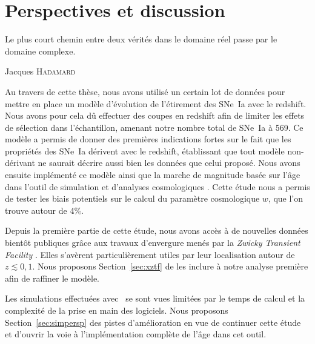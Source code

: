 \documentclass[../main/main.tex]{subfiles}
\begin{document}

\chapter{Perspectives et discussion}\label{ch:persp}
\epigraph{\openquote Le plus court chemin entre deux vérités dans le domaine
    réel passe par le domaine complexe.\closequote}{Jacques \textsc{Hadamard}}

Au travers de cette thèse, nous avons utilisé un certain lot de données pour
mettre en place un modèle d'évolution de l'étirement des SNe~Ia avec le
redshift. Nous avons pour cela dû effectuer des coupes en redshift afin de
limiter les effets de sélection dans l'échantillon, amenant notre nombre total
de SNe~Ia à 569. Ce modèle a permis de donner des premières indications fortes
sur le fait que les propriétés des SNe~Ia dérivent avec le redshift, établissant
que tout modèle non-dérivant ne saurait décrire aussi bien les données que celui
proposé. Nous avons ensuite implémenté ce modèle ainsi que la marche de
magnitude basée sur l'âge dans l'outil de simulation et d'analyses cosmologiques
\snana. Cette étude nous a permis de tester les biais potentiels sur le calcul
du paramètre cosmologique $w$, que l'on trouve autour de 4\%.

Depuis la première partie de cette étude, nous avons accès à de nouvelles
données bientôt publiques grâce aux travaux d'envergure menés par la
\textit{Zwicky Transient Facility} \citep[ZTF,][]{bellm2019}. Elles s'avèrent
particulièrement utiles par leur localisation autour de $z \lesssim 0,1$. Nous
proposons Section~\ref{sec:xztf} de les inclure à notre analyse première afin de
raffiner le modèle.

Les simulations effectuées avec \snana\ se sont vues limitées par le temps de
calcul et la complexité de la prise en main des logiciels. Nous proposons
Section~\ref{sec:simpersp} des pistes d'amélioration en vue de continuer cette
étude et d'ouvrir la voie à l'implémentation complète de l'âge dans cet outil.

\vspace*{\fill}
\minitoc
\vspace*{\fill}

\clearpage

\thispagestyle{plain}
\vspace*{\fill}
\minilof
\vspace*{\fill}
\minilot
\vspace*{\fill}
\end{document}
